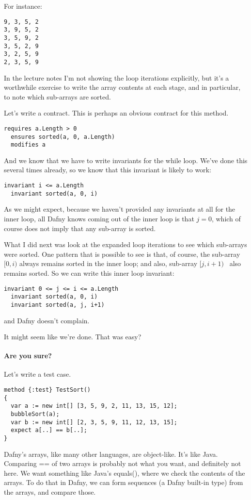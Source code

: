 \documentclass[11pt]{article}
\begin{document}
For instance:
{\scriptsize
\begin{verbatim}
9, 3, 5, 2
3, 9, 5, 2
3, 5, 9, 2
3, 5, 2, 9
3, 2, 5, 9
2, 3, 5, 9
\end{verbatim}
}
In the lecture notes I'm not showing the loop iterations explicitly, but it's a worthwhile
exercise to write the array contents at each stage, and in particular, to note which sub-arrays are
sorted.

Let's write a contract. This is perhaps an obvious contract for this method.
\begin{lstlisting}[language=dafny]
  requires a.Length > 0
  ensures sorted(a, 0, a.Length)
  modifies a
\end{lstlisting}
And we know that we have to write invariants for the \textsf{while} loop. We've done this
several times already, so we know that this invariant is likely to work:
\begin{lstlisting}[language=dafny]
  invariant i <= a.Length
  invariant sorted(a, 0, i)
\end{lstlisting}
As we might expect, because we haven't provided any invariants at all for the inner loop,
all Dafny knows coming out of the inner loop is that $j = 0$, which of course does not imply
that any sub-array is sorted.

What I did next was look at the expanded loop iterations to see which sub-arrays were
sorted. One pattern that is possible to see is that, of course, the sub-array %
$[0, i)$ %
always remains sorted in the inner loop; and also, sub-array %
$[j, i+1)$%
~also remains sorted.
So we can write this inner loop invariant:
\begin{lstlisting}[language=dafny]
  invariant 0 <= j <= i <= a.Length
  invariant sorted(a, 0, i)
  invariant sorted(a, j, i+1)
\end{lstlisting}
and Dafny doesn't complain.

It might seem like we're done. That was easy?

\paragraph{Are you sure?} Let's write a test case.
\begin{lstlisting}[language=dafny]
method {:test} TestSort()
{
  var a := new int[] [3, 5, 9, 2, 11, 13, 15, 12];
  bubbleSort(a);
  var b := new int[] [2, 3, 5, 9, 11, 12, 13, 15];
  expect a[..] == b[..];
}
\end{lstlisting}
Dafny's arrays, like many other languages,
are object-like. It's like Java. Comparing \textsf{={}=} of two arrays is probably not what you
want, and definitely not here. We want something like Java's \textsf{equals()}, where we check the
contents of the arrays. To do that in Dafny, we can form sequences (a Dafny built-in type) from the arrays,
and compare those.
\end{document}
